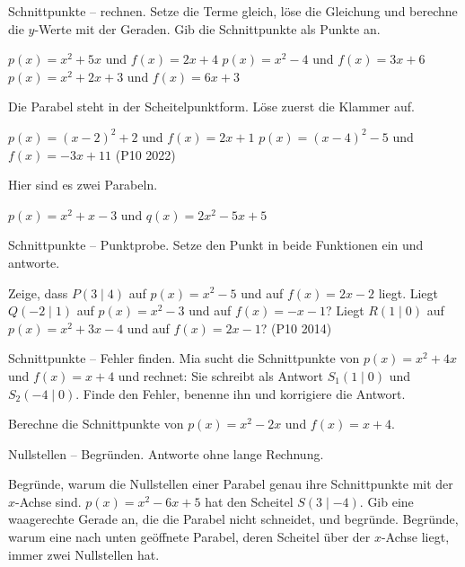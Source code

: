 \begin{aufgabe}{Schnittpunkte -- rechnen. Setze die Terme gleich, löse die Gleichung
und berechne die $y$-Werte mit der Geraden. Gib die Schnittpunkte als Punkte an.}
\begin{teile}
\teil $p(x) = x^2 + 5x$ \quad und \quad $f(x) = 2x + 4$
\teil $p(x) = x^2 - 4$ \quad und \quad $f(x) = 3x + 6$
\teil $p(x) = x^2 + 2x + 3$ \quad und \quad $f(x) = 6x + 3$
\end{teile}
Die Parabel steht in der Scheitelpunktform. Löse zuerst die Klammer auf.
\begin{teile}
\setcounter{teil}{3}
\teil $p(x) = (x - 2)^2 + 2$ \quad und \quad $f(x) = 2x + 1$
\teil $p(x) = (x - 4)^2 - 5$ \quad und \quad $f(x) = -3x + 11$ \hfill (P10 2022)
\end{teile}
Hier sind es zwei Parabeln.
\begin{teile}
\setcounter{teil}{5}
\teil $p(x) = x^2 + x - 3$ \quad und \quad $q(x) = 2x^2 - 5x + 5$
\end{teile}
\end{aufgabe}

\begin{aufgabe}{Schnittpunkte -- Punktprobe. Setze den Punkt in beide Funktionen ein
und antworte.}
\begin{teile}
\teil Zeige, dass $P(3 \mid 4)$ auf $p(x) = x^2 - 5$ und auf $f(x) = 2x - 2$ liegt.
\teil Liegt $Q(-2 \mid 1)$ auf $p(x) = x^2 - 3$ und auf $f(x) = -x - 1$?
\teil Liegt $R(1 \mid 0)$ auf $p(x) = x^2 + 3x - 4$ und auf $f(x) = 2x - 1$?
\hfill (P10 2014)
\end{teile}
\end{aufgabe}

\begin{aufgabe}{Schnittpunkte -- Fehler finden. Mia sucht die Schnittpunkte von
$p(x) = x^2 + 4x$ und $f(x) = x + 4$ und rechnet:}
Sie schreibt als Antwort $S_1(1 \mid 0)$ und $S_2(-4 \mid 0)$. Finde den Fehler,
benenne ihn und korrigiere die Antwort.

\begin{teile}
\teil Berechne die Schnittpunkte von $p(x) = x^2 - 2x$ und $f(x) = x + 4$.
\end{teile}
\end{aufgabe}

\begin{aufgabe}{Nullstellen -- Begründen. Antworte ohne lange Rechnung.}
\begin{teile}
\teil Begründe, warum die Nullstellen einer Parabel genau ihre Schnittpunkte mit der
$x$-Achse sind.
\teil $p(x) = x^2 - 6x + 5$ hat den Scheitel $S(3 \mid -4)$. Gib eine waagerechte
Gerade an, die die Parabel nicht schneidet, und begründe.
\teil Begründe, warum eine nach unten geöffnete Parabel, deren Scheitel über der
$x$-Achse liegt, immer zwei Nullstellen hat.
\end{teile}
\end{aufgabe}
